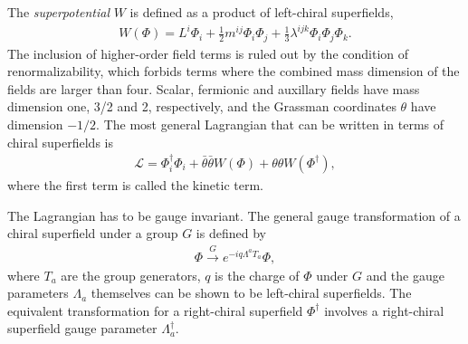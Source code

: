 \documentclass[twoside,english]{uiofysmaster}
\begin{document}
The {\it superpotential} $W$ is defined as a product of left-chiral superfields,
 \begin{align}
 	W(\Phi) = L^i\Phi_i + \frac{1}{2}m^{ij}\Phi_i\Phi_j + \frac{1}{3}\lambda^{ijk}\Phi_i\Phi_j\Phi_k.
 \end{align}
The inclusion of higher-order field terms is ruled out by the condition of renormalizability, which forbids terms where the combined mass dimension of the fields are larger than four. Scalar, fermionic and auxillary fields have mass dimension one, 3/2 and 2, respectively, and the Grassman coordinates $\theta$ have dimension $-1/2$. The most general Lagrangian that can be written in terms of chiral superfields is
\begin{align}
	\mathcal{L} = \Phi_i^\dag \Phi_i + \bar\theta\bar\theta W(\Phi) + \theta\theta W(\Phi^\dag),
\end{align}
where the first term is called the kinetic term. 

The Lagrangian has to be gauge invariant. The general gauge transformation of a chiral superfield under a group $G$ is defined by
\begin{align}
	\Phi \overset{G}{\to} e^{-iq\Lambda^a T_a}\Phi,
\end{align}
where $T_a$ are the group generators, $q$ is the charge of $\Phi$ under $G$ and the gauge parameters $\Lambda_a$ themselves can be shown to be left-chiral superfields. The equivalent transformation for a right-chiral superfield $\Phi^\dag$ involves a right-chiral superfield gauge parameter $\Lambda_a^\dag$.
\end{document}
